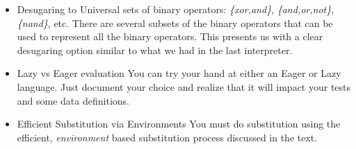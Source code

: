 \documentclass[10pt]{article}
\begin{document}
\begin{itemize}
 
\item Desugaring to Universal sets of binary operators: \textit{\{xor,and\}}, \textit{\{and,or,not\}}, \textit{\{nand\}}, etc.
\newline
There are several subsets of the binary operators that can be used to represent all the binary operators. This presents us with a clear desugaring option similar to what we had in the last interpreter. 

\item Lazy vs Eager evaluation
\newline
You can try your hand at either an Eager or Lazy language. Just document your choice and realize that it will impact your tests and some data definitions.

\item Efficient Substitution via Environments
\newline
You must do substitution using the efficient, \textit{environment} based substitution process discussed in the text. 
\end{itemize}
\end{document}
